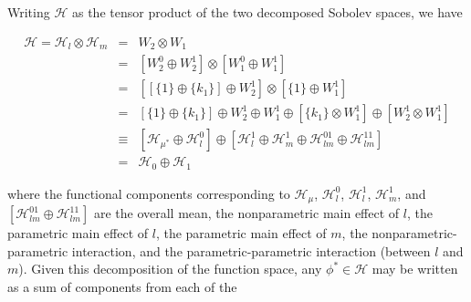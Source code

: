 \noindent
Writing $\mathcal{H}$ as the tensor product of the two decomposed Sobolev spaces, we have

\begin{eqnarray}
\mathcal{H} = \mathcal{H}_l  \otimes \mathcal{H}_m &=& W_2 \otimes W_1 \label{eq:HilbertDecomp} \\ 
&=& \left[ W_2^0 \oplus W_2^1 \right] \otimes \left[ W_1^0 \oplus W_1^1 \right] \nonumber \\ 
&=& \left[ \left[ \lbrace 1 \rbrace \oplus \lbrace k_1 \rbrace \right] \oplus W_2^1 \right] \otimes \left[ \lbrace 1 \rbrace \oplus W_1^1 \right] \nonumber \\ 
&=&\left[ \lbrace 1 \rbrace  \oplus \lbrace k_1 \rbrace \right] \oplus W_2^1 \oplus W_1^1 \oplus  \left[ \lbrace k_1 \rbrace  \otimes  W_1^1 \right]  \oplus  \left[W_2^1 \otimes  W_1^1   \right] \nonumber \\
&\equiv& \left[ \mathcal{H}_{\mu^*} \oplus \mathcal{H}_l^0 \right] \oplus \left[ \mathcal{H}_l^1 \oplus \mathcal{H}_m^1 \oplus \mathcal{H}_{lm}^{01} \oplus \mathcal{H}_{lm}^{11}\right]
\nonumber\\
&=& \mathcal{H}_0 \oplus \mathcal{H}_1
\nonumber
\end{eqnarray} 

\noindent
where the functional components corresponding to $\mathcal{H}_\mu$, $\mathcal{H}_l^0$, $\mathcal{H}_l^1$, $\mathcal{H}_m^1$, and $\left[ \mathcal{H}_{lm}^{01} \oplus \mathcal{H}_{lm}^{11}\right]$ are the overall mean, the nonparametric main effect of $l$, the parametric main effect of $l$, the parametric main effect of $m$, the nonparametric-parametric interaction, and the parametric-parametric interaction (between $l$ and $m$). Given this decomposition of the function space, any $\phi^* \in \mathcal{H}$ may be written as a sum of components from each of the 

